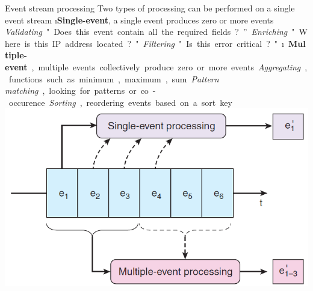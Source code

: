 \begin{frame}[allowframebreaks]{Event stream processing}
Two types of processing can be performed on a single event stream
\i \textbf{Single-event}, a single event produces zero or more events
\si \textit{Validating} "Does this event contain all the required fields?”
\si \textit{Enriching} "Where is this IP address located?"
\si \textit{Filtering} "Is this error critical?"
\i \textbf{Multiple-event}, multiple events collectively produce zero or more events
\si \textit{Aggregating}, functions such as minimum, maximum, sum
\si \textit{Pattern matching}, looking for patterns or co-occurence
\si \textit{Sorting}, reordering events based on a sort key
\includegraphics[width=.8\linewidth]{imgs/eventstream_processing.jpg}
\end{frame}


